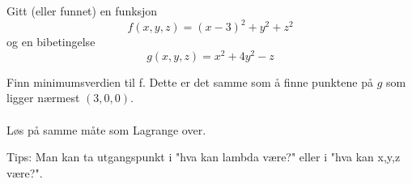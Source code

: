 Gitt (eller funnet) en funksjon
$$f(x,y,z) = (x-3)^2 + y^2 + z^2$$
og en bibetingelse
$$g(x,y,z) = x^2 + 4y^2 - z$$

Finn minimumsverdien til f.
Dette er det samme som å finne punktene på $g$
som ligger nærmest $(3,0,0)$.
\\\\
Løs på samme måte som Lagrange over.

Tips: Man kan ta utgangspunkt i "hva kan lambda være?" eller i
"hva kan x,y,z være?".
